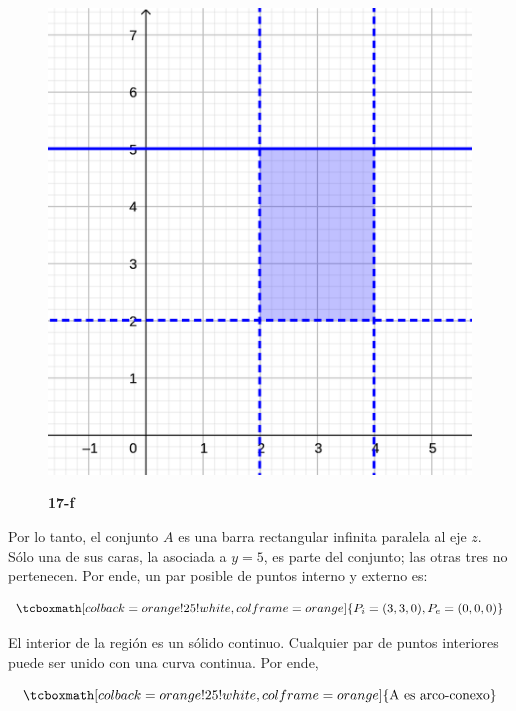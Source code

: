 \documentclass{article}
\begin{document}
\begin{enumerate}[(a)]
\begin{figure}[ht]
\caption{\textbf{17-f}}
\includegraphics[scale=0.7]{img/ejercicios/1/17-f.png} 
\centering
\label{fig:1-17-f}
\end{figure}

Por lo tanto, el conjunto $A$ es una barra rectangular infinita paralela al eje $z$. Sólo una de sus caras, la asociada a $y = 5$, es parte del conjunto; las otras tres no pertenecen. Por ende, un par posible de puntos interno y externo es:

\begin{equation}
\tcboxmath[colback=orange!25!white,colframe=orange]
{
P_i = (3, 3, 0), P_e = (0, 0, 0)
}
\end{equation}

El interior de la región es un sólido continuo. Cualquier par de puntos interiores puede ser unido con una curva continua. Por ende,

\begin{equation}
\tcboxmath[colback=orange!25!white,colframe=orange]
{ \text{A es arco-conexo} }
\end{equation}

\end{enumerate}
\end{document}

